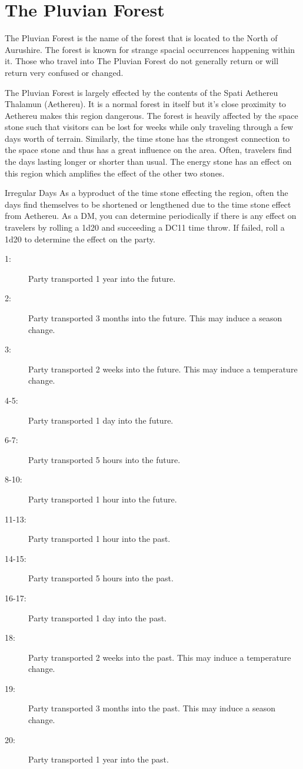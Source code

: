 \documentclass[letterpaper,10pt,twoside,twocolumn,openany]{book}
\begin{document}
\section{The Pluvian Forest}

The Pluvian Forest is the name of the forest that is located to the North of Aurushire. The forest is known for strange spacial occurrences happening within it. Those who travel into The Pluvian Forest do not generally return or will return very confused or changed.

The Pluvian Forest is largely effected by the contents of the Spati Aethereu Thalamun (Aethereu). It is a normal forest in itself but it's close proximity to Aethereu makes this region dangerous. The forest is heavily affected by the space stone such that visitors can be lost for weeks while only traveling through a few days worth of terrain. Similarly, the time stone has the strongest connection to the space stone and thus has a great influence on the area. Often, travelers find the days lasting longer or shorter than usual. The energy stone has an effect on this region which amplifies the effect of the other two stones.

\begin{commentbox}{Irregular Days}
	As a byproduct of the time stone effecting the region, often the days find themselves to be shortened or lengthened due to the time stone effect from Aethereu. As a DM, you can determine periodically if there is any effect on travelers by rolling a 1d20 and succeeding a DC11 time throw. If failed, roll a 1d20 to determine the effect on the party.
	\hline
	\begin{description}
		\item[1:] Party transported 1 year into the future. 
		\item[2:] Party transported 3 months into the future. This may induce a season change. 
		\item[3:] Party transported 2 weeks into the future. This may induce a temperature change.
		\item[4-5:] Party transported 1 day into the future. 
		\item[6-7:] Party transported 5 hours into the future. 
		\item[8-10:] Party transported 1 hour into the future. 
		\item[11-13:] Party transported 1 hour into the past. 
		\item[14-15:] Party transported 5 hours into the past. 
		\item[16-17:] Party transported 1 day into the past. 
		\item[18:] Party transported 2 weeks into the past. This may induce a temperature change. 
		\item[19:] Party transported 3 months into the past. This may induce a season change. 
		\item[20:] Party transported 1 year into the past. 
	\end{description}
\end{commentbox}
\end{document}
